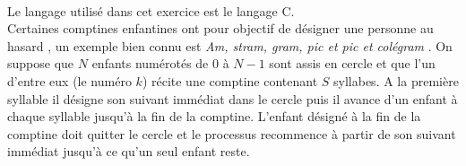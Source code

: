 \documentclass[11pt,a4paper]{article}
\begin{document}
\begin{Exercise*}[title = {type B}]\\
Le langage utilisé dans cet exercice est le langage C. \smallskip\\
Certaines comptines enfantines ont pour objectif de désigner une personne \og{} au hasard \fg{}, un exemple bien connu est \og{} \textit{Am, stram, gram, pic et pic et colégram} \fg{}. On suppose que $N$ enfants numérotés de 0 à $N-1$ sont assis en cercle et que l'un d'entre eux (le numéro $k$) récite une comptine contenant $S$ syllabes. A la première syllable il désigne son suivant immédiat dans le cercle puis il avance d'un enfant à chaque syllable jusqu'à la fin de la comptine. L'enfant désigné à la fin de la comptine doit quitter le cercle et le processus recommence à partir de son suivant immédiat jusqu'à ce qu'un seul enfant reste.


\end{Exercise*}
\end{document}

